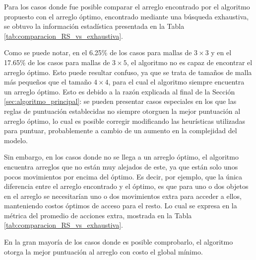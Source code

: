 Para los casos donde fue posible comparar el arreglo encontrado por el algoritmo propuesto con el arreglo óptimo, encontrado mediante una búsqueda exhaustiva, se obtuvo la información estadística presentada en la Tabla \ref{tab:comparacion_RS_vs_exhaustiva}.
%
\begin{table}[H]
\renewcommand{\arraystretch}{1.4}%
%
\captionsetup{width=\tablewidth}%
\caption{Resultados del algoritmo propuesto para mallas de tamaño igual o menor a $4\times 4$.}%
\label{tab:comparacion_RS_vs_exhaustiva}%
\end{table}
%
Como se puede notar, en el 6.25\% de los casos para mallas de $3\times 3$ y en el 17.65\% de los casos para mallas de $3\times 5$, el algoritmo no es capaz de encontrar el arreglo óptimo.
Esto puede resultar confuso, ya que se trata de tamaños de malla más pequeños que el tamaño $4\times 4$, para el cual el algoritmo siempre encuentra un arreglo óptimo.
Esto es debido a la razón explicada al final de la Sección \ref{sec:algoritmo_principal}: se pueden presentar casos especiales en los que las reglas de puntuación establecidas no siempre otorguen la mejor puntuación al arreglo óptimo, lo cual es posible corregir modificando las heurísticas utilizadas para puntuar, probablemente a cambio de un aumento en la complejidad del modelo.

Sin embargo, en los casos donde no se llega a un arreglo óptimo, el algoritmo encuentra arreglos que no están muy alejados de este, ya que están solo unos pocos movimientos por encima del óptimo.
Es decir, por ejemplo, que la única diferencia entre el arreglo encontrado y el óptimo, es que para uno o dos objetos en el arreglo se necesitarían uno o dos movimientos extra para acceder a ellos, manteniendo costos óptimos de acceso para el resto.
Lo cual se expresa en la métrica del promedio de acciones extra, mostrada en la Tabla \ref{tab:comparacion_RS_vs_exhaustiva}.

En la gran mayoría de los casos donde es posible comprobarlo, el algoritmo otorga la mejor puntuación al arreglo con costo el global mínimo.